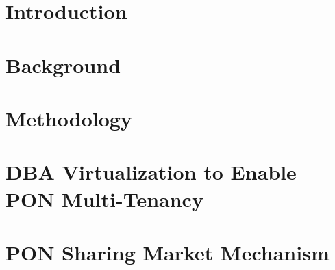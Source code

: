 \documentclass[11pt,a4paper,twoside,openright]{report}
\begin{document}
%





\cleardoublepage
{}%

%

\cleardoublepage {}







\listoftodos[Notes]
\clearpage
\tableofcontents
\clearpage
\listoffigures
\clearpage
\listoftables


\cleardoublepage%
%
\setlength{\parskip}{1ex plus 0.5ex minus 0.2ex} %

\chapter{Introduction}
\label{cpt:introduction}\acresetall%


\chapter{Background}
\label{cpt:background}\acresetall%


\chapter{Methodology}
\label{cpt:methodology}\acresetall%


\chapter{DBA Virtualization to Enable PON Multi-Tenancy}
\label{cpt:chapter_1}\acresetall%


\chapter{PON Sharing Market Mechanism}
\label{cpt:chapter_2}\acresetall%

\end{document}
